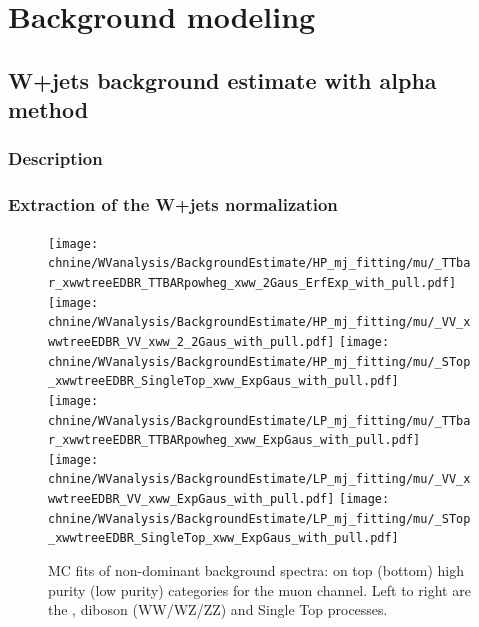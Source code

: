 \chapter{Background modeling}
\label{ch:bkgModel}

\section{W+jets background estimate with alpha method}

 \subsection{Description}
 
 \subsection{Extraction of the W+jets normalization}
 
 \begin{figure}[htbp]
\centering
\texttt{[image: \\chnine/WVanalysis/BackgroundEstimate/HP\_mj\_fitting/mu/\_TTbar\_xwwtreeEDBR\_TTBARpowheg\_xww\_2Gaus\_ErfExp\_with\_pull.pdf]}
\texttt{[image: \\chnine/WVanalysis/BackgroundEstimate/HP\_mj\_fitting/mu/\_VV\_xwwtreeEDBR\_VV\_xww\_2\_2Gaus\_with\_pull.pdf]}
\texttt{[image: \\chnine/WVanalysis/BackgroundEstimate/HP\_mj\_fitting/mu/\_STop\_xwwtreeEDBR\_SingleTop\_xww\_ExpGaus\_with\_pull.pdf]}\\
\texttt{[image: \\chnine/WVanalysis/BackgroundEstimate/LP\_mj\_fitting/mu/\_TTbar\_xwwtreeEDBR\_TTBARpowheg\_xww\_ExpGaus\_with\_pull.pdf]}
\texttt{[image: \\chnine/WVanalysis/BackgroundEstimate/LP\_mj\_fitting/mu/\_VV\_xwwtreeEDBR\_VV\_xww\_ExpGaus\_with\_pull.pdf]}
\texttt{[image: \\chnine/WVanalysis/BackgroundEstimate/LP\_mj\_fitting/mu/\_STop\_xwwtreeEDBR\_SingleTop\_xww\_ExpGaus\_with\_pull.pdf]}\\
\caption{MC fits of non-dominant background \mJ spectra: on top (bottom) high purity (low purity) categories for the muon
channel. Left to right are the \ttbar, diboson (WW/WZ/ZZ) and Single Top processes.}
\label{fig:mcfitsjetmass_1}
\end{figure}

